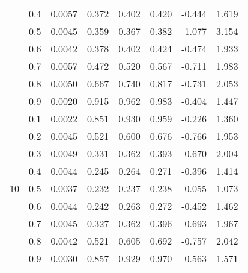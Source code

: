 \documentclass[11pt,a4paper]{report}
\begin{document}
\begin{longtable}{ | c | c || c | c | c | c | c | c | }
 & 0.4 & 0.0057 & 0.372 & 0.402 & 0.420 & -0.444 & 1.619 \\
 & 0.5 & 0.0045 & 0.359 & 0.367 & 0.382 & -1.077 & 3.154 \\
 & 0.6 & 0.0042 & 0.378 & 0.402 & 0.424 & -0.474 & 1.933 \\
 & 0.7 & 0.0057 & 0.472 & 0.520 & 0.567 & -0.711 & 1.983 \\
 & 0.8 & 0.0050 & 0.667 & 0.740 & 0.817 & -0.731 & 2.053 \\
 & 0.9 & 0.0020 & 0.915 & 0.962 & 0.983 & -0.404 & 1.447 \\
 \hline
\multirow{9}{*}{10} & 0.1 & 0.0022 & 0.851 & 0.930 & 0.959 & -0.226 & 1.360 \\
 & 0.2 & 0.0045 & 0.521 & 0.600 & 0.676 & -0.766 & 1.953 \\
 & 0.3 & 0.0049 & 0.331 & 0.362 & 0.393 & -0.670 & 2.004 \\
 & 0.4 & 0.0044 & 0.245 & 0.264 & 0.271 & -0.396 & 1.414 \\
 & 0.5 & 0.0037 & 0.232 & 0.237 & 0.238 & -0.055 & 1.073 \\
 & 0.6 & 0.0044 & 0.242 & 0.263 & 0.272 & -0.452 & 1.462 \\
 & 0.7 & 0.0045 & 0.327 & 0.362 & 0.396 & -0.693 & 1.967 \\
 & 0.8 & 0.0042 & 0.521 & 0.605 & 0.692 & -0.757 & 2.042 \\
 & 0.9 & 0.0030 & 0.857 & 0.929 & 0.970 & -0.563 & 1.571 \\
 \hline
\hline
\end{longtable}
\end{document}
